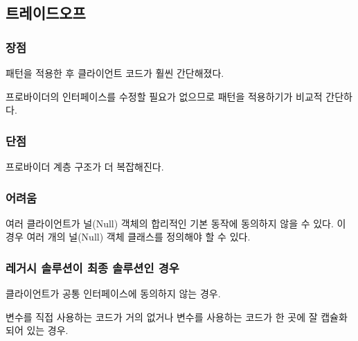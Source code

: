 \documentclass[a4paper,10pt,twoside]{book}
\begin{document}
\subsection*{트레이드오프}

\subsubsection*{장점}

\begin{bulletlist}
\item 패턴을 적용한 후 클라이언트 코드가 훨씬 간단해졌다.

\item 프로바이더의 인터페이스를 수정할 필요가 없으므로 패턴을 적용하기가 비교적 간단하다.
\end{bulletlist}

\subsubsection*{단점}

\begin{bulletlist}
\item 프로바이더 계층 구조가 더 복잡해진다.
\end{bulletlist}

\subsubsection*{어려움}

\begin{bulletlist}
	\item 여러 클라이언트가 널(Null) 객체의 합리적인 기본 동작에 동의하지 않을 수 있다. 이 경우 여러 개의 널(Null) 객체 클래스를 정의해야 할 수 있다.
\end{bulletlist}

\subsubsection*{레거시 솔루션이 최종 솔루션인 경우}

\begin{bulletlist}
\item 클라이언트가 공통 인터페이스에 동의하지 않는 경우.

\item 변수를 직접 사용하는 코드가 거의 없거나 변수를 사용하는 코드가 한 곳에 잘 캡슐화되어 있는 경우.
\end{bulletlist}
\end{document}
